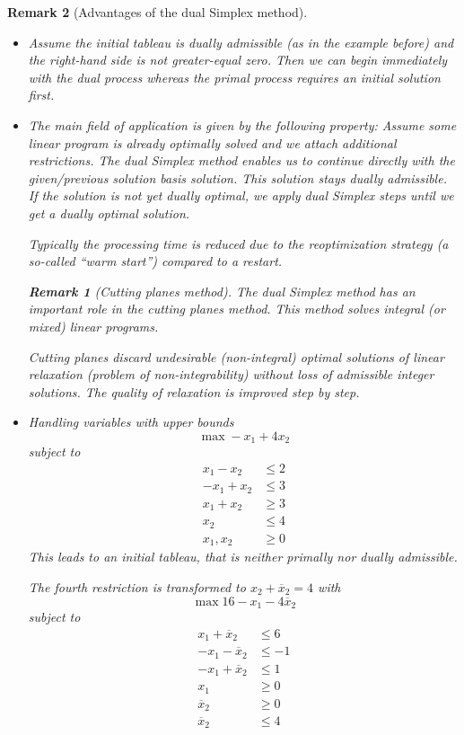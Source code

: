 \documentclass[a4paper]{article}
\numberwithin{lecref}{subsection}
\newtheorem*{Remark}{Remark}
\begin{document}
\begin{Remark}[Advantages of the dual Simplex method]
	\begin{itemize}
		\item Assume the initial tableau is dually admissible (as in the example before) and the right-hand side is not greater-equal zero.
			Then we can begin immediately with the dual process whereas the primal process requires an initial solution first.
		\item The main field of application is given by the following property:
			Assume some linear program is already optimally solved and we attach additional restrictions.
			The dual Simplex method enables us to continue directly with the given/previous solution basis solution. This solution stays dually admissible.
			If the solution is not yet dually optimal, we apply dual Simplex steps until we get a dually optimal solution.

			Typically the processing time is reduced due to the reoptimization strategy (a so-called \enquote{warm start}) compared to a restart.

			\begin{Remark}[Cutting planes method]
				The dual Simplex method has an important role in the cutting planes method.
				This method solves integral (or mixed) linear programs.

				Cutting planes discard undesirable (non-integral) optimal solutions of linear relaxation (problem of non-integrability) without loss of admissible integer solutions.
				The quality of relaxation is improved step by step.
			\end{Remark}
		\item Handling variables with upper bounds
			\[ \max -x_1 + 4 x_2 \]
			subject to
			\begin{align*}
				x_1 - x_2 &\leq 2 \\
				-x_1 + x_2 &\leq 3 \\
				x_1 + x_2 &\geq 3 \\
				x_2 &\leq 4 \\
				x_1, x_2 &\geq 0
			\end{align*}
			This leads to an initial tableau, that is neither primally nor dually admissible.

			The fourth restriction is transformed to $x_2 + \overline{x}_2 = 4$ with
			\[ \max 16 - x_1 - 4\overline{x}_2 \]
			subject to
			\begin{align*}
				x_1 + \overline{x}_2 &\leq 6 \\
				-x_1 - \overline{x}_2 &\leq -1 \\
				-x_1 + \overline{x}_2 &\leq 1 \\
				x_1 &\geq 0 \\
				\overline x_2 &\geq 0 \\
				\overline x_2 &\leq 4
			\end{align*}


\end{itemize}
\end{Remark}
\end{document}
